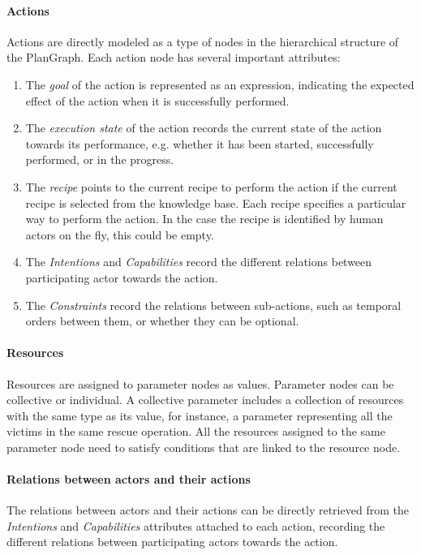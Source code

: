 \paragraph*{Actions} %
\label{par:actions_in_plangraph}
Actions are directly modeled as a type of nodes in the hierarchical structure of the PlanGraph. Each action node has several important attributes:
\begin{enumerate}
	\item The \emph{goal} of the action is represented as an expression, indicating the expected effect of the action when it is successfully performed.
	\item The \emph{execution state} of the action records the current state of the action towards its performance, e.g. whether it has been started, successfully performed, or in the progress.
	\item The \emph{recipe} points to the current recipe to perform the action if the current recipe is selected from the knowledge base. Each recipe specifies a particular way to perform the action. In the case the recipe is identified by human actors on the fly, this could be empty.
	\item The \emph{Intentions} and \emph{Capabilities} record the different relations between participating actor towards the action.
	\item The \emph{Constraints} record the relations between sub-actions, such as temporal orders between them, or whether they can be optional.
\end{enumerate}

\paragraph*{Resources} %
\label{par:resources_in_plangraph}
Resources are assigned to parameter nodes as values. Parameter nodes can be collective or individual. A collective parameter includes a collection of resources with the same type as its value, for instance, a parameter representing all the victims in the same rescue operation. All the resources assigned to the same parameter node need to satisfy conditions that are linked to the resource node.

\paragraph*{Relations between actors and their actions} %
\label{par:relations_between_actors_and_their_actions}
The relations between actors and their actions can be directly retrieved from the \emph{Intentions} and \emph{Capabilities} attributes attached to each action, recording the different relations between participating actors towards the action.


